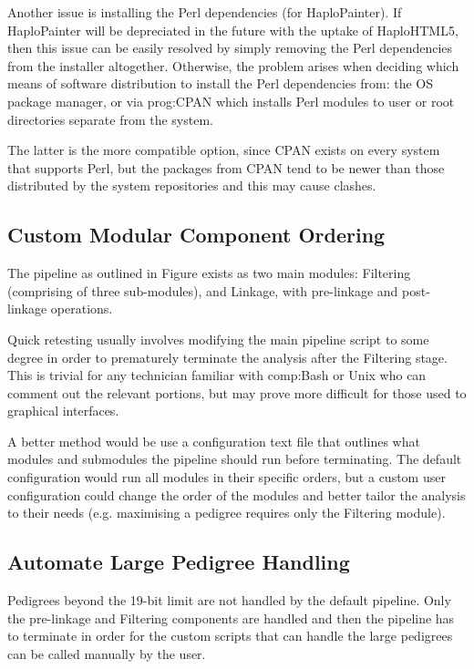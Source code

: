 Another issue is installing the Perl dependencies (for HaploPainter). If HaploPainter will be depreciated in the future with the uptake of HaploHTML5, then this issue can be easily resolved by simply removing the Perl dependencies from the installer altogether. Otherwise, the problem arises when deciding which means of software distribution to install the Perl dependencies from: the OS package manager, or via \gls{prog:CPAN} \cite{cpan} which installs Perl modules to user or root directories separate from the system.

The latter is the more compatible option, since CPAN exists on every system that supports Perl, but the packages from CPAN tend to be newer than those distributed by the system repositories and this may cause clashes.


\subsection{Custom Modular Component Ordering}

The pipeline as outlined in Figure exists as two main modules: Filtering (comprising of three sub-modules), and Linkage, with pre-linkage and post-linkage operations.

Quick retesting usually involves modifying the main pipeline script to some degree in order to prematurely terminate the analysis after the Filtering stage. This is trivial for any technician familiar with \gls{comp:Bash} or Unix who can comment out the relevant portions, but may prove more difficult for those used to graphical interfaces.

A better method would be use a configuration text file that outlines what modules and submodules the pipeline should run before terminating. The default configuration would run all modules in their specific orders, but a custom user configuration could change the order of the modules and better tailor the analysis to their needs (e.g. maximising a pedigree requires only the Filtering module).

\subsection{Automate Large Pedigree Handling}

Pedigrees beyond the 19-bit limit are not handled by the default pipeline. Only the pre-linkage and Filtering components are handled and then the pipeline has to terminate in order for the custom scripts that can handle the large pedigrees can be called manually by the user.

